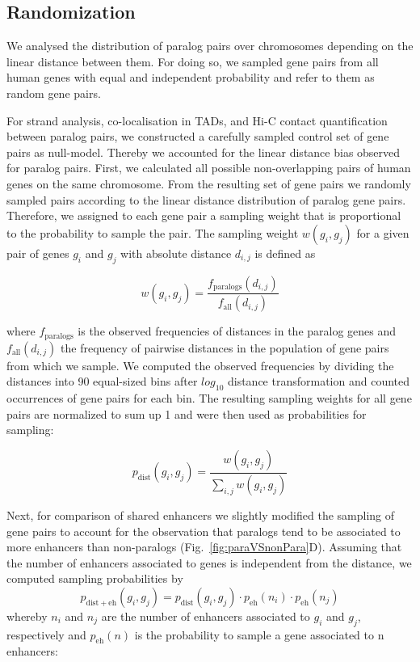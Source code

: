 \documentclass[a4paper,twoside=true,openright,parskip=full,chapterprefix=true,11pt,headings=normal,bibliography=totoc,listof=totoc,titlepage=on,captions=tableabove,draft=false]{scrreprt}
\theoremstyle{definition}
\theoremstyle{definition}
\theoremstyle{definition}
\theoremstyle{remark}
\begin{document}
\subsection{Randomization}\label{randomization}

We analysed the distribution of paralog pairs over chromosomes depending
on the linear distance between them. For doing so, we sampled gene pairs
from all human genes with equal and independent probability and refer to
them as random gene pairs.

For strand analysis, co-localisation in TADs, and Hi-C contact
quantification between paralog pairs, we constructed a carefully sampled
control set of gene pairs as null-model. Thereby we accounted for the
linear distance bias observed for paralog pairs. First, we calculated
all possible non-overlapping pairs of human genes on the same
chromosome. From the resulting set of gene pairs we randomly sampled
pairs according to the linear distance distribution of paralog gene
pairs. Therefore, we assigned to each gene pair a sampling weight that
is proportional to the probability to sample the pair. The sampling
weight \(w(g_{i}, g_{j})\) for a given pair of genes \(g_{i}\) and
\(g_{j}\) with absolute distance \(d_{i,j}\) is defined as

\[
w(g_{i}, g_{j}) = \frac{ f_{\mathrm{paralogs}}(d_{i,j}) }{f_{\mathrm{all}}(d_{i,j})}
\]

where \(f_{\mathrm{paralogs}}\) is the observed frequencies of distances
in the paralog genes and \(f_{\mathrm{all}}(d_{i,j})\) the frequency of
pairwise distances in the population of gene pairs from which we sample.
We computed the observed frequencies by dividing the distances into 90
equal-sized bins after \(log_{10}\) distance transformation and counted
occurrences of gene pairs for each bin. The resulting sampling weights
for all gene pairs are normalized to sum up 1 and were then used as
probabilities for sampling:

\[
p_{\mathrm{dist}}(g_{i}, g_{j}) = \frac{ w(g_{i}, g_{j}) }{ \sum_{i,j} w(g_{i}, g_{j}) }
\label{eq:DistProb}
\]

Next, for comparison of shared enhancers we slightly modified the
sampling of gene pairs to account for the observation that paralogs tend
to be associated to more enhancers than non-paralogs
(Fig.~\ref{fig:paraVSnonPara}D). Assuming that the number of enhancers
associated to genes is independent from the distance, we computed
sampling probabilities by \[
p_{\mathrm{dist+eh}}(g_{i}, g_{j}) = p_{\mathrm{dist}}(g_{i}, g_{j}) \cdot p_{\mathrm{eh}}(n_{i}) \cdot p_{\mathrm{eh}}(n_{j})
\] whereby \(n_{i}\) and \(n_{j}\) are the number of enhancers
associated to \(g_{i}\) and \(g_{j}\), respectively and
\(p_{\mathrm{eh}}(n)\) is the probability to sample a gene associated to
n enhancers:
\end{document}
